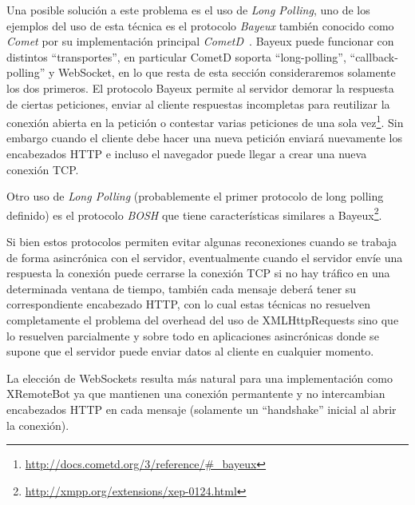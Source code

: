 Una posible solución a este problema es el uso de \textit{Long Polling},
uno de los ejemplos del uso de esta técnica es el protocolo \textit{Bayeux}
también conocido como \textit{Comet} por
su implementación principal
\textit{CometD}~\citep{roden_2010}. Bayeux puede funcionar con distintos
``transportes'', en particular CometD soporta ``long-polling'',
``callback-polling'' y WebSocket, en lo que resta de esta sección
consideraremos solamente los dos primeros.
El protocolo Bayeux permite al servidor demorar la respuesta
de ciertas peticiones, enviar al cliente respuestas incompletas para reutilizar
la conexión abierta en la petición o contestar varias peticiones de
una sola vez\footnote{\url{http://docs.cometd.org/3/reference/\#_bayeux}}.
Sin embargo cuando el cliente debe hacer una nueva petición enviará
nuevamente los encabezados HTTP e incluso el navegador puede llegar a
crear una nueva conexión TCP.

Otro uso de \textit{Long Polling} (probablemente el primer protocolo
de long polling definido) es el protocolo \textit{BOSH} que tiene
características similares a
Bayeux\footnote{\url{http://xmpp.org/extensions/xep-0124.html}}.

Si bien estos protocolos permiten evitar algunas reconexiones cuando
se trabaja de forma asincrónica con el servidor, eventualmente cuando el
servidor envíe una respuesta la conexión puede cerrarse la conexión TCP
si no hay tráfico en una determinada ventana de tiempo,
también cada mensaje
deberá tener su correspondiente encabezado HTTP, con lo cual
estas técnicas no resuelven completamente el problema del overhead del
uso de XMLHttpRequests sino que lo resuelven parcialmente y sobre todo
en aplicaciones asincrónicas donde se supone que el servidor puede enviar
datos al cliente en cualquier momento.

La elección de WebSockets resulta más natural para una implementación
como XRemoteBot ya que mantienen una conexión permantente y no intercambian
encabezados HTTP en cada mensaje (solamente un ``handshake'' inicial
al abrir la conexión).

